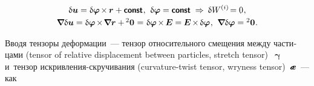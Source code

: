 \begin{otherlanguage}{russian}
\nopagebreak\vspace{-0.1em}\begin{equation*}
\begin{array}{c}
\variation{\fieldofdisplacements} = \variation{\fieldofrotations} \hspace{-0.2ex} \times \hspace{-0.12ex} \bm{r} + \boldconst \hspace{.1ex} ,
\:\,
\variation{\fieldofrotations} = \boldconst
\hspace{.64ex}\Rightarrow\hspace{.5ex}
\variation{\internalwork} \hspace{-0.2ex} = 0 \hspace{.1ex},
\\[.25em]
%
\boldnabla \variation{\fieldofdisplacements}
= \variation{\fieldofrotations} \hspace{-0.2ex} \times \hspace{-0.3ex} \boldnabla \bm{r} + \hspace{-0.16ex} {^2\bm{0}} \hspace{.1ex}
= \hspace{.1ex} \variation{\fieldofrotations} \hspace{-0.2ex} \times \hspace{-0.2ex} \bm{E}
= \hspace{-0.1ex} \bm{E} \hspace{-0.2ex} \times \hspace{-0.2ex} \variation{\fieldofrotations}
\hspace{.1ex} ,
\:\,
\boldnabla \variation{\fieldofrotations} = {^2\bm{0}} \hspace{.1ex} .
\end{array}
\end{equation*}

\vspace{-0.1em} Вводя тензоры деформации~--- тензор относительного смещения между частицами (tensor of relative displacement between particles, stretch tensor)~$\bm{\upgamma}$ и~тензор искривления-скручивания (curvature-twist tensor, wryness tensor)~$\mathboldae$~--- как


\end{otherlanguage}
